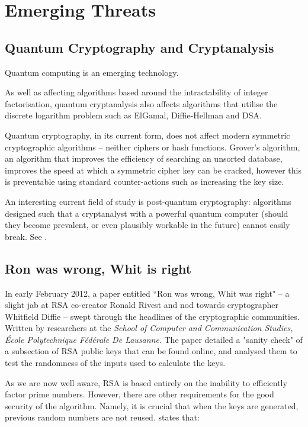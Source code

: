 \section{Emerging Threats}

  \subsection{Quantum Cryptography and Cryptanalysis}
  
    Quantum computing is an emerging technology.
    
    
    As well as affecting algorithms based around the intractability of integer factorisation, quantum cryptanalysis also affects algorithms that utilise the discrete logarithm problem such as ElGamal, Diffie-Hellman and DSA.
    
    Quantum cryptography, in its current form, does not affect modern symmetric cryptographic algorithms -- neither ciphers or hash functions. Grover's algorithm, an algorithm that improves the efficiency of searching an unsorted database, improves the speed at which a symmetric cipher key can be cracked, however this is preventable using standard counter-actions such as increasing the key size. 
    
    An interesting current field of study is post-quantum cryptography: algorithms designed such that a cryptanalyst with a powerful quantum computer (should they become prevalent, or even plausibly workable in the future) cannot easily break. See \cite{Bernstein:2009aa}.
  
  \subsection{Ron was wrong, Whit is right}
  \label{subsec:ronwhit}
  
    In early February 2012, a paper entitled ``Ron was wrong, Whit was right" -- a slight jab at RSA co-creator Ronald Rivest and nod towards cryptographer Whitfield Diffie -- swept through the headlines of the cryptographic communities. Written by researchers at the \emph{School of Computer and Communication Studies, \'{E}cole Polytechnique F\'{e}d\'{e}rale De Lausanne}. The paper detailed a "sanity check" of a subsection of RSA public keys that can be found online, and analysed them to test the randomness of the inputs used to calculate the keys.
    
    As we are now well aware, RSA is based entirely on the inability to efficiently factor prime numbers. However, there are other requirements for the good security of the algorithm. Namely, it is crucial that when the keys are generated, previous random numbers are not reused. \cite{Loebenberger:2011aa} states that: 
    
